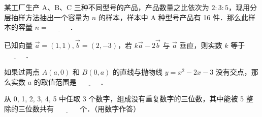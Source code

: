 \begin{question}
某工厂生产 A、B、C 三种不同型号的产品，产品数量之比依次为 $2 : 3 : 5$，现用分层抽样方法抽出一个容量为 $n$ 的样本，样本中 A 种型号产品有 16 件．那么此样本的容量 $n = \underline{\hspace{3em}}$．

\end{question}
\begin{question}
已知向量 $\vec{a} = (1, 1), \vec{b} = (2, -3)$，若 $k\vec{a} - 2\vec{b}$ 与 $\vec{a}$ 垂直，则实数 $k$ 等于 $\underline{\hspace{3em}}$．

\end{question}
\begin{question}
如果过两点 $A(a, 0)$ 和 $B(0, a)$ 的直线与抛物线 $y = x^2 - 2x - 3$ 没有交点，那么实数 $a$ 的取值范围是 $\underline{\hspace{3em}}$．

\end{question}
\begin{question}
从 0, 1, 2, 3, 4, 5 中任取 3 个数字，组成没有重复数字的三位数，其中能被 5 整除的三位数共有 $\underline{\hspace{3em}}$ 个．（用数字作答）

\end{question}

